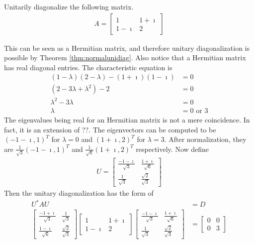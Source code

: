 \begin{exmp}
Unitarily diagonalize the following matrix.
\begin{align*}
A =
\begin{bmatrix}
1 & 1+\imath \\
1-\imath & 2
\end{bmatrix}
\end{align*}
\end{exmp}
\begin{solution}
This can be seen as a Hermitian matrix, and therefore unitary diagonalization is possible by Theorem \ref{thm:normalunidiag}. Also notice that a Hermitian matrix has real diagonal entries. The characteristic equation is 
\begin{align*}
(1-\lambda)(2-\lambda) - (1+\imath)(1-\imath) &= 0 \\
(2 - 3\lambda + \lambda^2) - 2 &= 0 \\
\lambda^2 - 3\lambda &= 0 \\
\lambda &= 0 \text{ or } 3
\end{align*}
The eigenvalues being real for an Hermitian matrix is not a mere coincidence. In fact, it is an extension of ??. The eigenvectors can be computed to be $(-1-\imath, 1)^T$ for $\lambda = 0$ and $(1+\imath, 2)^T$ for $\lambda = 3$. After normalization, they are $\frac{1}{\sqrt{3}}(-1-\imath, 1)^T$ and $\frac{1}{\sqrt{6}}(1+\imath, 2)^T$ respectively. Now define
\begin{align*}
U =
\begin{bmatrix}
\frac{-1-\imath}{\sqrt{3}} & \frac{1+\imath}{\sqrt{6}} \\
\frac{1}{\sqrt{3}} & \frac{\sqrt{2}}{\sqrt{3}}
\end{bmatrix}
\end{align*}
Then the unitary diagonalization has the form of
\begin{align*}
U^* AU &= D \\
\begin{bmatrix}
\frac{-1+\imath}{\sqrt{3}} & \frac{1}{\sqrt{3}} \\
\frac{1-\imath}{\sqrt{6}} & \frac{\sqrt{2}}{\sqrt{3}}
\end{bmatrix}
\begin{bmatrix}
1 & 1+\imath \\
1-\imath & 2
\end{bmatrix}
\begin{bmatrix}
\frac{-1-\imath}{\sqrt{3}} & \frac{1+\imath}{\sqrt{6}} \\
\frac{1}{\sqrt{3}} & \frac{\sqrt{2}}{\sqrt{3}}
\end{bmatrix}
&=
\begin{bmatrix}
0 & 0 \\
0 & 3
\end{bmatrix}
\end{align*}
\end{solution}

